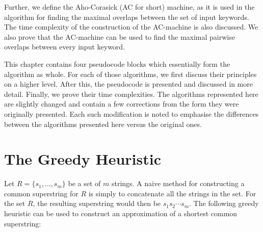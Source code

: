 \documentclass[english,twoside,censored,csm,algorithms-track-2020]{HYthesisML}
\theoremstyle{plain}
\theoremstyle{definition}
\numberwithin{testexample}{chapter}
\begin{document}
Further, we define the Aho-Corasick (AC for short) machine, as it is used in the algorithm for finding
the maximal overlaps between the set of input keywords. The time complexity of the construction of
the AC-machine is also discussed. We also prove that the AC-machine can be used to find the maximal
pairwise overlaps between every input keyword.

This chapter contains four pseudocode blocks which essentially form the algorithm as whole.
For each of those algorithms, we first discuss their principles on a higher level. After this,
the pseudocode
is presented and discussed in more detail. Finally, we prove their time complexities.
The algorithms represented here are slightly changed and contain a few corrections from the form they
were originally presented. Each such modification is noted to emphasise the differences between
the algorithms presented here versus the original ones.



\section{The Greedy Heuristic}

  

Let $R=\{s_1,...,s_m\}$ be a set of $m$ strings. A naive method for constructing a common superstring
for $R$ is simply to concatenate all the strings in the set. For the set $R$, the resulting superstring
would then be $s_1s_2\cdots s_m$.
The following greedy heuristic can be used to construct an approximation of a shortest
common superstring:
\end{document}
